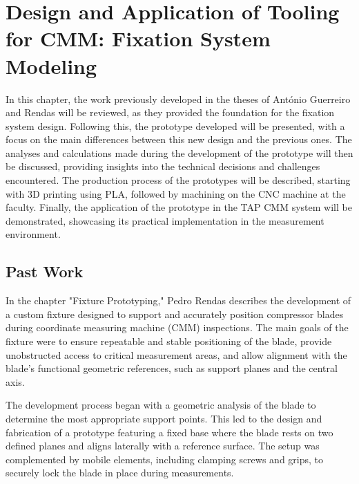 
%

\chapter{Design and Application of Tooling for CMM: Fixation System Modeling}
\label{cha:dig}

In this chapter, the work previously developed in the theses of António Guerreiro and Rendas will be reviewed, as they provided the foundation for the fixation system design. 
Following this, the prototype developed will be presented, with a focus on the main differences between this new design and the previous ones. 
The analyses and calculations made during the development of the prototype will then be discussed, providing insights into the technical decisions and challenges encountered. 
The production process of the prototypes will be described, starting with 3D printing using PLA, followed by machining on the CNC machine at the faculty. 
Finally, the application of the prototype in the TAP CMM system will be demonstrated, showcasing its practical implementation in the measurement environment.

\section{Past Work}
\label{sec:pastfix}

In the chapter "Fixture Prototyping," Pedro Rendas describes the development of a custom fixture designed to support and accurately position compressor blades during coordinate measuring machine (CMM) inspections.
The main goals of the fixture were to ensure repeatable and stable positioning of the blade, provide unobstructed access to critical measurement areas, and allow alignment with the blade’s functional geometric references, such as support planes and the central axis.

The development process began with a geometric analysis of the blade to determine the most appropriate support points. 
This led to the design and fabrication of a prototype featuring a fixed base where the blade rests on two defined planes and aligns laterally with a reference surface. 
The setup was complemented by mobile elements, including clamping screws and grips, to securely lock the blade in place during measurements.

